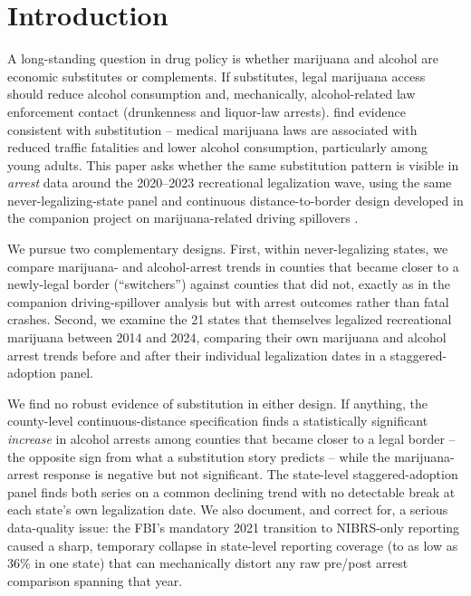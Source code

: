 \documentclass[11pt]{article}
\begin{document}
\section{Introduction}

A long-standing question in drug policy is whether marijuana and
alcohol are economic substitutes or complements. If substitutes, legal
marijuana access should reduce alcohol consumption and, mechanically,
alcohol-related law enforcement contact (drunkenness and liquor-law
arrests). \citet{AndersonHansenRees2013} find evidence consistent with
substitution -- medical marijuana laws are associated with reduced
traffic fatalities and lower alcohol consumption, particularly among
young adults. This paper asks whether the same substitution pattern is
visible in \emph{arrest} data around the 2020--2023 recreational
legalization wave, using the same never-legalizing-state panel and
continuous distance-to-border design developed in the companion
project on marijuana-related driving spillovers
\citep{HaoCowan2020,Moyer2026}.

We pursue two complementary designs. First, within never-legalizing
states, we compare marijuana- and alcohol-arrest trends in counties
that became closer to a newly-legal border (``switchers'') against
counties that did not, exactly as in the companion driving-spillover
analysis but with arrest outcomes rather than fatal crashes. Second,
we examine the 21 states that themselves legalized recreational
marijuana between 2014 and 2024, comparing their own marijuana and
alcohol arrest trends before and after their individual legalization
dates in a staggered-adoption panel.

We find no robust evidence of substitution in either design. If
anything, the county-level continuous-distance specification finds a
statistically significant \emph{increase} in alcohol arrests among
counties that became closer to a legal border -- the opposite sign
from what a substitution story predicts -- while the marijuana-arrest
response is negative but not significant. The state-level
staggered-adoption panel finds both series on a common declining
trend with no detectable break at each state's own legalization date.
We also document, and correct for, a serious data-quality issue: the
FBI's mandatory 2021 transition to NIBRS-only reporting caused a sharp,
temporary collapse in state-level reporting coverage (to as low as 36\%
in one state) that can mechanically distort any raw pre/post arrest
comparison spanning that year.
\end{document}
